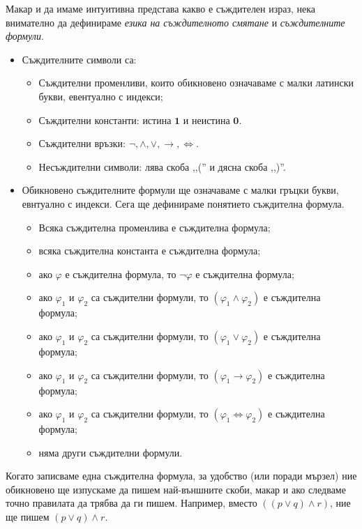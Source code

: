 Макар и да имаме интуитивна представа какво е съждителен израз, нека внимателно да дефинираме {\em езика на съждителното смятане} и
{\em съждителните формули}.
\begin{itemize}
\item 
  Съждителните символи са:
  \begin{itemize}
  \item 
    Съждителни променливи, които обикновено означаваме с малки латински букви, евентуално с индекси;
  \item
    Съждителни константи: истина $\mathbf{1}$ и неистина $\mathbf{0}$.
  \item
    Съждителни връзки: $\neg, \land, \lor, \to, \iff$.
  \item
    Несъждителни символи: лява скоба ,,('' и дясна скоба ,,)''.
  \end{itemize}
\item
  Обикновено съждителните формули ще означаваме с малки гръцки букви, евнтуално с индекси.
  Сега ще дефинираме понятието съждителна формула.
  
  \begin{itemize}
  \item 
    Всяка съждителна променлива е съждителна формула;
  \item
    всяка съждителна константа е съждителна формула;
  \item
    ако $\varphi$ е съждителна формула, то $\neg \varphi$ е съждителна формула;
  \item
    ако $\varphi_1$ и $\varphi_2$ са съждителни формули, то $(\varphi_1 \land \varphi_2)$ е съждителна формула;
  \item
    ако $\varphi_1$ и $\varphi_2$ са съждителни формули, то $(\varphi_1 \lor \varphi_2)$ е съждителна формула;
  \item
    ако $\varphi_1$ и $\varphi_2$ са съждителни формули, то $(\varphi_1 \to \varphi_2)$ е съждителна формула;
  \item
    ако $\varphi_1$ и $\varphi_2$ са съждителни формули, то $(\varphi_1 \iff \varphi_2)$ е съждителна формула;
  \item
    няма други съждителни формули.
  \end{itemize}    
\end{itemize}

\begin{remark}
  Когато записваме една съждителна формула, за удобство (или поради мързел) ние обикновено ще изпускаме да пишем най-външните скоби,
  макар и ако следваме точно правилата да трябва да ги пишем.
  Например, вместо $((p \lor q) \land r) $, ние ще пишем $(p \lor q) \land r$.
\end{remark}


